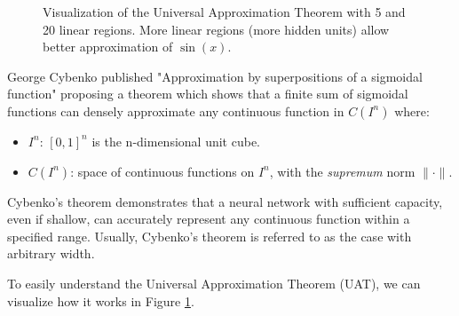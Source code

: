 \documentclass{tufte-handout}
\begin{document}
\begin{figure}[h]
\caption{Visualization of the Universal Approximation Theorem with 5 and 20 linear regions. More linear regions (more hidden units) allow better approximation of $\sin(x)$.}
\label{fig:UAT}
\end{figure}

George Cybenko published "Approximation by superpositions of a sigmoidal function" proposing a theorem which shows that a finite sum of sigmoidal functions can densely approximate any continuous function in $C(I^n)$ where:
\begin{itemize}
    \item $I^n$: $[0,1]^n$ is the n-dimensional unit cube.
    \item $C(I^n)$: space of continuous functions on $I^n$, with the \textit{supremum} norm $\| \cdot \|$.
\end{itemize}

Cybenko's theorem demonstrates that a neural network with sufficient capacity, even if shallow, can accurately represent any continuous function within a specified range. Usually, Cybenko's theorem is referred to as the case with arbitrary width.

To easily understand the Universal Approximation Theorem (UAT), we can visualize how it works in Figure \ref{fig:UAT}.
\end{document}
